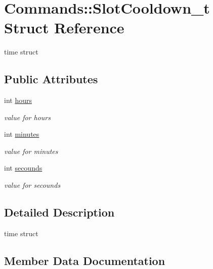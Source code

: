 \hypertarget{struct_commands_1_1_slot_cooldown__t}{}\section{Commands\+:\+:Slot\+Cooldown\+\_\+t Struct Reference}
\label{struct_commands_1_1_slot_cooldown__t}


time struct  


\subsection*{Public Attributes}
\begin{DoxyCompactItemize}
\item 
int \mbox{\hyperlink{struct_commands_1_1_slot_cooldown__t_adab754561db3ab9f93d4cf8bd5feec27}{hours}}
\begin{DoxyCompactList}\small\item\em value for hours \end{DoxyCompactList}\item 
int \mbox{\hyperlink{struct_commands_1_1_slot_cooldown__t_a4d1e1f8e9bfdfc25013eb07393e37b52}{minutes}}
\begin{DoxyCompactList}\small\item\em value for minutes \end{DoxyCompactList}\item 
int \mbox{\hyperlink{struct_commands_1_1_slot_cooldown__t_a4ac1a455c45218e842847bb79c514f72}{secounds}}
\begin{DoxyCompactList}\small\item\em value for secounds \end{DoxyCompactList}\end{DoxyCompactItemize}


\subsection{Detailed Description}
time struct 

\subsection{Member Data Documentation}
\mbox{\label{struct_commands_1_1_slot_cooldown__t_adab754561db3ab9f93d4cf8bd5feec27}} 
